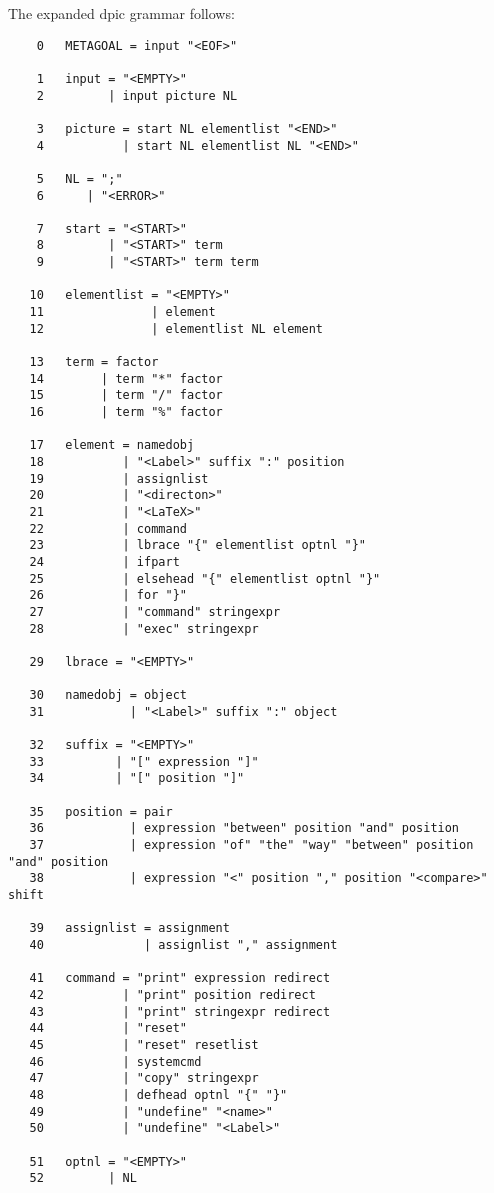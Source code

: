 \documentclass[11pt]{article}
\begin{document}
The expanded dpic grammar follows:
\begin{verbatim}
    0   METAGOAL = input "<EOF>" 

    1   input = "<EMPTY>" 
    2         | input picture NL 

    3   picture = start NL elementlist "<END>" 
    4           | start NL elementlist NL "<END>" 

    5   NL = ";" 
    6      | "<ERROR>" 

    7   start = "<START>" 
    8         | "<START>" term 
    9         | "<START>" term term 

   10   elementlist = "<EMPTY>" 
   11               | element 
   12               | elementlist NL element 

   13   term = factor 
   14        | term "*" factor 
   15        | term "/" factor 
   16        | term "%" factor 

   17   element = namedobj 
   18           | "<Label>" suffix ":" position 
   19           | assignlist 
   20           | "<directon>" 
   21           | "<LaTeX>" 
   22           | command 
   23           | lbrace "{" elementlist optnl "}" 
   24           | ifpart 
   25           | elsehead "{" elementlist optnl "}" 
   26           | for "}" 
   27           | "command" stringexpr 
   28           | "exec" stringexpr 

   29   lbrace = "<EMPTY>" 

   30   namedobj = object 
   31            | "<Label>" suffix ":" object 

   32   suffix = "<EMPTY>" 
   33          | "[" expression "]" 
   34          | "[" position "]" 

   35   position = pair 
   36            | expression "between" position "and" position 
   37            | expression "of" "the" "way" "between" position "and" position 
   38            | expression "<" position "," position "<compare>" shift 

   39   assignlist = assignment 
   40              | assignlist "," assignment 

   41   command = "print" expression redirect 
   42           | "print" position redirect 
   43           | "print" stringexpr redirect 
   44           | "reset" 
   45           | "reset" resetlist 
   46           | systemcmd 
   47           | "copy" stringexpr 
   48           | defhead optnl "{" "}" 
   49           | "undefine" "<name>" 
   50           | "undefine" "<Label>" 

   51   optnl = "<EMPTY>" 
   52         | NL 


\end{verbatim}
\end{document}
